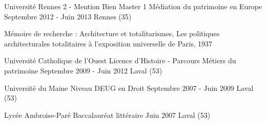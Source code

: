 \begin{cventries}
\cventry
    {Université Rennes 2 - Mention Bien} %
    {Master 1 Médiation du patrimoine en Europe} %
    {Septembre 2012 - Juin 2013} %
    {Rennes (35)} %
    {
      \begin{cvitems} %
        \item {Mémoire de recherche : Architecture et totalitarismes, Les politiques architecturales totalitaires à l'exposition universelle de Paris, 1937}
      \end{cvitems}
    }
    \cventry
    {Université Catholique de l'Ouest} %
    {Licence d'Histoire - Parcours Métiers du patrimoine} %
    {Septembre 2009 - Juin 2012} %
    {Laval (53)} %
    {
      \begin{cvitems} %
      \end{cvitems}
    }
    \cventry
    {Université du Maine} %
    {Niveau DEUG en Droit} %
    {Septembre 2007 - Juin 2009} %
    {Laval (53)} %
    {
      \begin{cvitems} %
      \end{cvitems}
    }
    \cventry
    {Lycée Ambroise-Paré} %
    {Baccalauréat littéraire} %
    {Juin 2007} %
    {Laval (53)} %
 {
      \begin{cvitems} %
      \end{cvitems}
    }
\end{cventries}
